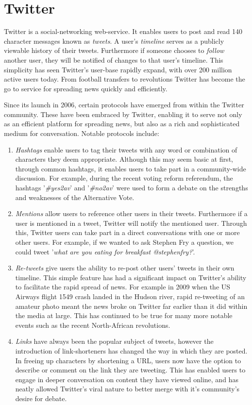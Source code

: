 \section{Twitter}
\label{background:twitter}

Twitter is a social-networking web-service. It enables users to post and read 140 character messages known as \emph{tweets}. A user's \emph{timeline} serves as a publicly viewable history of their tweets. Furthermore if someone chooses to \emph{follow} another user, they will be notified of changes to that user's timeline. This simplicity has seen Twitter's user-base rapidly expand, with over 200 million active users today. From football transfers to revolutions Twitter has become the go to service for spreading news quickly and efficiently.

Since its launch in 2006, certain protocols have emerged from within the Twitter community. These have been embraced by Twitter, enabling it to serve not only as an efficient platform for spreading news, but also as a rich and sophisticated medium for conversation. Notable protocols include:

\begin{enumerate}
	\item \emph{Hashtags} enable users to tag their tweets with any word or combination of characters they deem appropriate. Although this may seem basic at first, through common hashtags, it enables users to take part in a community-wide discussion. For example, during the recent voting reform referendum, the hashtags '\emph{\#yes2av}' and '\emph{\#no2av}' were used to form a debate on the strengths and weaknesses of the Alternative Vote. 
	\item \emph{Mentions} allow users to reference other users in their tweets. Furthermore if a user is mentioned in a tweet, Twitter will notify the mentioned user. Through this, Twitter users can take part in a direct conversations with one or more other users. For example, if we wanted to ask Stephen Fry a question, we could tweet '\emph{what are you eating for breakfast @stephenfry?}'.
	\item \emph{Re-tweets} give users the ability to re-post other users' tweets in their own timeline. This simple feature has had a significant impact on Twitter's ability to facilitate the rapid spread of news. For example in 2009 when the US Airways flight 1549 crash landed in the Hudson river, rapid re-tweeting of an amateur photo meant the news broke on Twitter far earlier than it did within the media at large. This has continued to be true for many more notable events such as the recent North-African revolutions.
	\item \emph{Links} have always been the popular subject of tweets, however the introduction of link-shorteners has changed the way in which they are posted. In freeing up characters by shortening a URL, users now have the option to describe or comment on the link they are tweeting. This has enabled users to engage in deeper conversation on content they have viewed online, and has neatly allowed Twitter's viral nature to better merge with it's community's desire for debate.
\end{enumerate}

